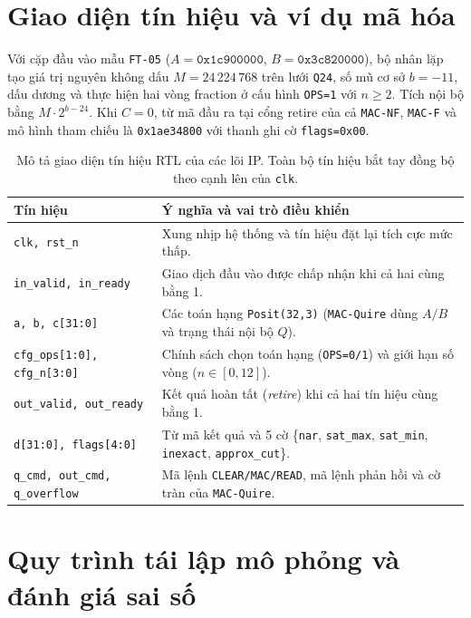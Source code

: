 \chapter{Giao diện tín hiệu và ví dụ mã hóa}
\label{app:signals}

Với cặp đầu vào mẫu \texttt{FT-05} ($A=\texttt{0x1c900000}$, $B=\texttt{0x3c820000}$),
bộ nhân lặp tạo giá trị nguyên không dấu $M=24\,224\,768$ trên lưới \texttt{Q24},
số mũ cơ sở $b=-11$, dấu dương và thực hiện hai vòng fraction ở cấu hình
\texttt{OPS=1} với $n \ge 2$. Tích nội bộ bằng $M \cdot 2^{b-24}$. Khi $C=0$,
từ mã đầu ra tại cổng retire của cả \texttt{MAC-NF}, \texttt{MAC-F} và mô hình
tham chiếu là \texttt{0x1ae34800} với thanh ghi cờ \texttt{flags=0x00}.

\begin{table}[htbp]
  \centering
  \caption{Mô tả giao diện tín hiệu RTL của các lõi IP. Toàn bộ tín hiệu bắt tay đồng bộ theo cạnh lên của \texttt{clk}.}
  \begin{tabularx}{\textwidth}{@{}>{\raggedright\arraybackslash}p{52mm}Y@{}}
    \toprule
    Tín hiệu & Ý nghĩa và vai trò điều khiển \\
    \midrule
    \texttt{clk, rst\_n} & Xung nhịp hệ thống và tín hiệu đặt lại tích cực mức thấp. \\
    \texttt{in\_valid, in\_ready} & Giao dịch đầu vào được chấp nhận khi cả hai cùng bằng 1. \\
    \texttt{a, b, c[31:0]} & Các toán hạng \texttt{Posit(32,3)} (\texttt{MAC-Quire} dùng $A/B$ và trạng thái nội bộ $Q$). \\
    \texttt{cfg\_ops[1:0], cfg\_n[3:0]} & Chính sách chọn toán hạng (\texttt{OPS=0/1}) và giới hạn số vòng ($n \in [0, 12]$). \\
    \texttt{out\_valid, out\_ready} & Kết quả hoàn tất (\textit{retire}) khi cả hai tín hiệu cùng bằng 1. \\
    \texttt{d[31:0], flags[4:0]} & Từ mã kết quả và 5 cờ \{\texttt{nar}, \texttt{sat\_max}, \texttt{sat\_min}, \texttt{inexact}, \texttt{approx\_cut}\}. \\
    \texttt{q\_cmd, out\_cmd, q\_overflow} & Mã lệnh \texttt{CLEAR/MAC/READ}, mã lệnh phản hồi và cờ tràn của \texttt{MAC-Quire}. \\
    \bottomrule
  \end{tabularx}
\end{table}

\chapter{Quy trình tái lập mô phỏng và đánh giá sai số}
\label{app:verification}

